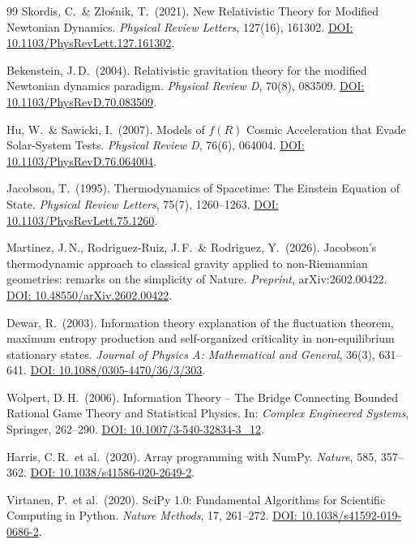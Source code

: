 \documentclass[aps,prd,twocolumn,superscriptaddress,nofootinbib]{revtex4-2}
\begin{document}
\begin{thebibliography}{99}
Skordis, C.\ \& Z{\l}o\'snik, T.\ (2021).
New Relativistic Theory for Modified Newtonian Dynamics.
\textit{Physical Review Letters}, 127(16), 161302.
\href{https://doi.org/10.1103/PhysRevLett.127.161302}{DOI: 10.1103/PhysRevLett.127.161302}.

Bekenstein, J.\,D.\ (2004).
Relativistic gravitation theory for the modified Newtonian dynamics paradigm.
\textit{Physical Review D}, 70(8), 083509.
\href{https://doi.org/10.1103/PhysRevD.70.083509}{DOI: 10.1103/PhysRevD.70.083509}.

Hu, W.\ \& Sawicki, I.\ (2007).
Models of $f(R)$ Cosmic Acceleration that Evade Solar-System Tests.
\textit{Physical Review D}, 76(6), 064004.
\href{https://doi.org/10.1103/PhysRevD.76.064004}{DOI: 10.1103/PhysRevD.76.064004}.

Jacobson, T.\ (1995).
Thermodynamics of Spacetime: The Einstein Equation of State.
\textit{Physical Review Letters}, 75(7), 1260--1263.
\href{https://doi.org/10.1103/PhysRevLett.75.1260}{DOI: 10.1103/PhysRevLett.75.1260}.

Martinez, J.\,N., Rodriguez-Ruiz, J.\,F.\ \& Rodriguez, Y.\ (2026).
Jacobson's thermodynamic approach to classical gravity applied to non-Riemannian geometries: remarks on the simplicity of Nature.
\textit{Preprint}, arXiv:2602.00422.
\href{https://doi.org/10.48550/arXiv.2602.00422}{DOI: 10.48550/arXiv.2602.00422}.

Dewar, R.\ (2003).
Information theory explanation of the fluctuation theorem, maximum entropy production and self-organized criticality in non-equilibrium stationary states.
\textit{Journal of Physics A: Mathematical and General}, 36(3), 631--641.
\href{https://doi.org/10.1088/0305-4470/36/3/303}{DOI: 10.1088/0305-4470/36/3/303}.

Wolpert, D.\,H.\ (2006).
Information Theory -- The Bridge Connecting Bounded Rational Game Theory and Statistical Physics.
In: \textit{Complex Engineered Systems}, Springer, 262--290.
\href{https://doi.org/10.1007/3-540-32834-3_12}{DOI: 10.1007/3-540-32834-3\_12}.

Harris, C.\,R.\ et al.\ (2020).
Array programming with NumPy.
\textit{Nature}, 585, 357--362.
\href{https://doi.org/10.1038/s41586-020-2649-2}{DOI: 10.1038/s41586-020-2649-2}.

Virtanen, P.\ et al.\ (2020).
SciPy 1.0: Fundamental Algorithms for Scientific Computing in Python.
\textit{Nature Methods}, 17, 261--272.
\href{https://doi.org/10.1038/s41592-019-0686-2}{DOI: 10.1038/s41592-019-0686-2}.


\end{thebibliography}
\end{document}
